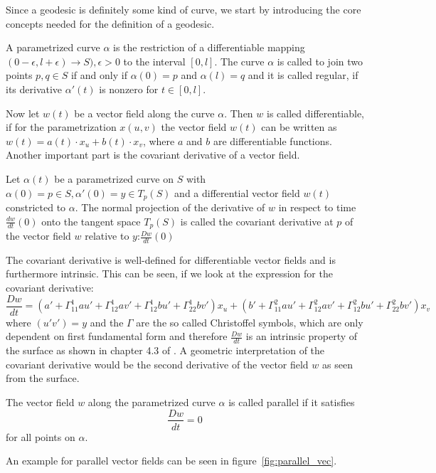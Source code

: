 Since a geodesic is definitely some kind of curve, we start by introducing the core concepts needed for the definition of a geodesic.
\begin{mydef}
	A parametrized curve $\alpha$ is the restriction of a differentiable mapping $( 0-\epsilon, l+\epsilon) \rightarrow S), \epsilon > 0$ to the interval $[0,l]$.
	The curve $\alpha$ is called to join two points $p,q \in S$ if and only if $\alpha(0) = p$ and $\alpha(l) = q$ and it is called regular, if its derivative $\alpha'(t)$ is nonzero for $t \in [0,l]$.
\end{mydef}
Now let $w(t)$ be a vector field along the curve $\alpha$.
Then $w$ is called differentiable, if for the parametrization $x(u,v)$ the vector field $w(t)$ can be written as $w(t) = a(t) \cdot x_u + b(t) \cdot x_v$, where $a$ and $b$ are differentiable functions.
Another important part is the covariant derivative of a vector field.
\begin{mydef}
	Let $\alpha(t)$ be a parametrized curve on $S$ with $\alpha(0) = p \in S, \alpha'(0) = y \in T_p(S)$ and a differential vector field $w(t)$ constricted to $\alpha$.
	The normal projection of the derivative of $w$ in respect to time $\frac{dw}{dt}(0)$ onto the tangent space $T_p(S)$ is called the covariant derivative at $p$ of the vector field $w$ relative to $y$:$\frac{Dw}{dt}(0)$
\end{mydef}
The covariant derivative is well-defined for differentiable vector fields and is furthermore intrinsic.
This can be seen, if we look at the expression for the covariant derivative:
$$\frac{Dw}{dt} = (a' + \Gamma^{1}_{1 1} a u' + \Gamma^{1}_{1 2} a v' + \Gamma^{1}_{1 2} b u' + \Gamma^{1}_{2 2} b v')x_u + (b' + \Gamma^{2}_{1 1} a u' + \Gamma^{2}_{1 2} a v' + \Gamma^{2}_{1 2} b u' + \Gamma^{2}_{2 2} b v')x_v$$
where $(u' v') = y$  and the $\Gamma$ are the so called Christoffel symbols, which are only dependent on first fundamental form and therefore $\frac{Dw}{dt}$ is an intrinsic property of the surface as shown in chapter 4.3 of \cite{do1976differential}.
A geometric interpretation of the covariant derivative would be the second derivative of the vector field $w$ as seen from the surface.
\begin{mydef}
	The vector field $w$ along the parametrized curve $\alpha$ is called parallel if it satisfies
	$$\frac{Dw}{dt} = 0 $$
	for all points on $\alpha$.
\end{mydef}
An example for parallel vector fields can be seen in figure~\ref{fig:parallel_vec}.
